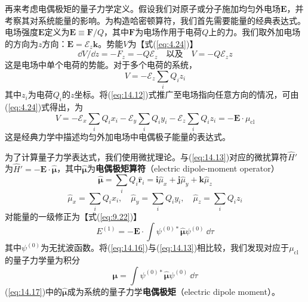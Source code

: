     再来考虑电偶极矩的量子力学定义。假设我们对原子或分子施加均匀外电场$\mathbf{E}$，并考察其对系统能量的影响。为构造哈密顿算符，我们首先需要能量的经典表达式。电场强度$\mathbf{E}$定义为$\mathbf{E} \equiv \mathbf{F}/Q$，其中$\mathbf{F}$为电场作用于电荷$Q$上的力。我们取外加电场的方向为$z$方向：$\mathbf{E} = \mathscr{E}_z\mathbf{k}$。势能$V$为【式(\ref{eq:4.24})】
    \begin{equation*}
        \dd V/\dd z = -F_z = -Q\mathscr{E}_z \quad \text{以及} \quad V = -Q\mathscr{E}_zz
    \end{equation*}
    这是电场中单个电荷的势能。对于多个电荷的系统，
    \begin{equation}
        V = -\mathscr{E}_z \sum_{i} Q_i z_i
        \label{eq:14.12}
    \end{equation}
    其中$z_i$为电荷$Q_i$的$z$坐标。将(\ref{eq:14.12})式推广至电场指向任意方向的情况，可由(\ref{eq:4.24})式得出，为
    \begin{equation}
        V = -\mathscr{E}_x \sum_i Q_i x_i - \mathscr{E}_y \sum_i Q_i y_i - \mathscr{E}_z \sum_i Q_i z_i = -\mathbf{E} \cdot \mu_{\text{cl}}
        \label{eq:14.13}
    \end{equation}
    这是经典力学中描述均匀外加电场中电偶极子能量的表达式。

    为了计算量子力学表达式，我们使用微扰理论。与(\ref{eq:14.13})对应的微扰算符$\hat{H}'$为$\hat{H}' = -\mathbf{E}\cdot \hat{\symbf{\mu}}$，其中$\hat{\symbf{\mu}}$为\textbf{电偶极矩算符}（electric dipole-moment operator）
    \begin{equation}
        \hat{\symbf{\mu}} = \sum_i Q_i \hat{\mathbf{r}}_i = \mathbf{i}\hat{\mu}_x + \mathbf{j}\hat{\mu}_y + \mathbf{k}\hat{\mu}_z
        \label{eq:14.14}
    \end{equation}
    \begin{equation}
        \hat{\mu}_x = \sum_i Q_i x_i, \quad \hat{\mu}_y = \sum_i Q_i y_i, \quad \hat{\mu}_z = \sum_i Q_i z_i
        \label{eq:14.15}
    \end{equation}
    对能量的一级修正为【式(\ref{eq:9.22})】
    \begin{equation}
        E^{\left(1\right)} = -\mathbf{E}\cdot \int \psi^{\left(0\right)*} \hat{\symbf{\mu}} \psi^{\left(0\right)} \:\dd \tau
        \label{eq:14.16}
    \end{equation}
    其中$\psi^{\left(0\right)}$为无扰波函数。将(\ref{eq:14.16})与(\ref{eq:14.13})相比较，我们发现对应于$\mu_{\text{cl}}$的量子力学量为积分
    \begin{equation}
        \symbf{\mu} = \int \psi^{\left(0\right)*} \hat{\symbf{\mu}} \psi^{\left(0\right)} \:\dd \tau
        \label{eq:14.17}
    \end{equation}
    (\ref{eq:14.17})中的$\hat{\symbf{\mu}}$成为系统的量子力学\textbf{电偶极矩}（electric dipole moment）。

